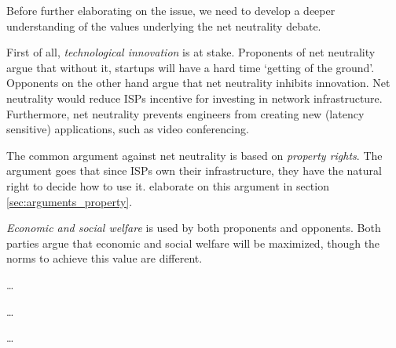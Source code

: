 
Before further elaborating on the issue, we need to develop a deeper understanding of the values underlying the net neutrality debate.

First of all, \emph{technological innovation} is at stake. Proponents of net neutrality argue that without it, startups will have a hard time `getting of the ground'. Opponents on the other hand argue that net neutrality inhibits innovation. Net neutrality would reduce \acp{ISP} incentive for investing in network infrastructure. Furthermore, net neutrality prevents engineers from creating new (latency sensitive) applications, such as video conferencing.

The common argument against net neutrality is based on \emph{property rights}. The argument goes that since \acp{ISP} own their infrastructure, they have the natural right to decide how to use it.  elaborate on this argument in section \ref{sec:arguments_property}.

\emph{Economic and social welfare} is used by both proponents and opponents. Both parties argue that economic and social welfare will be maximized, though the norms to achieve this value are different.

\ldots

\ldots

\ldots